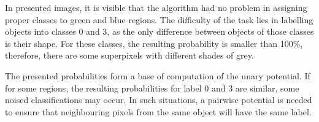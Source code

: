 In presented images, it is visible that the algorithm had no problem in assigning proper classes to green and blue regions. The difficulty of the task lies in labelling objects into classes 0 and 3, as the only difference between objects of those classes is their shape. For these classes, the resulting probability is smaller than 100\%, therefore, there are some superpixels with different shades of grey. 

The presented probabilities form a base of computation of the unary potential. If for some regions, the resulting probabilities for label 0 and 3 are similar, some noised classifications may occur. In such situations, a pairwise potential is needed to ensure that neighbouring pixels from the same object will have the same label.